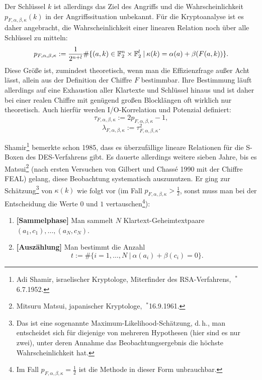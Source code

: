 \begin{refsegment}
Der Schlüssel $k$ ist allerdings das Ziel des Angriffs und die
Wahrscheinlichkeit $p_{F,\alpha,\beta,\kappa}(k)$ in der
Angriffssituation unbekannt. Für die Kryptoanalyse ist es daher
angebracht, die Wahrscheinlichkeit einer linearen Relation noch
über alle Schlüssel zu mitteln:
\begin{equation}\label{eq-bool-avrg}
   p_{F,\alpha,\beta,\kappa} := \frac{1}{2^{n+l}}
      \#\{(a,k) \in \mathbb{F}_2^n \times \mathbb{F}_2^l \:|\:
           \kappa(k) = \alpha(a) + \beta(F(a,k)) \}.
\end{equation}
Diese Größe ist, zumindest theoretisch, wenn man die Effizienzfrage
außer Acht lässt, allein aus der Definition der Chiffre $F$ bestimmbar.
Ihre Bestimmung läuft allerdings auf eine Exhaustion aller Klartexte
und Schlüssel hinaus und ist daher bei einer realen Chiffre mit
genügend großen Blocklängen oft wirklich nur theoretisch.
Auch hierfür werden  I/O-Korrelation und
Potenzial definiert:
\[
   \tau_{F,\alpha,\beta,\kappa} := 2 p_{F,\alpha,\beta,\kappa} - 1,
\]
\[
   \lambda_{F,\alpha,\beta,\kappa} := \tau_{F,\alpha,\beta,\kappa}^2.
\]

Shamir\footnote{%
  Adi Shamir, israelischer Kryptologe, Miterfinder des RSA-Verfahrens,
  $~^{\ast}$6.7.1952.
}
bemerkte schon 1985, dass es überzufällige lineare
Relationen
für die S-Boxen des DES-Verfahrens gibt. Es dauerte allerdings weitere
sieben Jahre, bis es Matsui\footnote{%
  Mitsuru Matsui, japanischer Kryptologe, $~^{\ast}$16.9.1961.
}
(nach ersten Versuchen von Gilbert und Chassé 1990 mit der Chiffre FEAL)
gelang, diese Beobachtung systematisch
auszunutzen. Er ging zur Schätzung\footnote{%
   Das ist eine sogenannte Maximum-Likelihood-Schätzung, d.\,h.,
   man entscheidet sich für diejenige von mehreren Hypothesen (hier
   sind es nur zwei), unter deren Annahme das Beobachtungsergebnis
   die höchste Wahrscheinlichkeit hat.
} von $\kappa(k)$ wie folgt vor
(im Fall $p_{F,\alpha,\beta,\kappa} > \frac{1}{2}$, sonst muss man
bei der Entscheidung die Werte $0$ und $1$ vertauschen\footnote{%
  Im Fall $p_{F,\alpha,\beta,\kappa} = \frac{1}{2}$ ist die
  Methode in dieser Form unbrauchbar.
}):
\begin{enumerate}
	\item {\bf [Sammelphase]} Man sammelt $N$ Klartext-Geheimtextpaare
	  $(a_1,c_1), \ldots, (a_N,c_N)$.

	\item {\bf [Auszählung]} Man bestimmt die Anzahl
\[
    t := \# \{i = 1, \ldots, N \:|\: \alpha(a_i) + \beta(c_i) = 0\}.
\]


\end{enumerate}
\end{refsegment}
